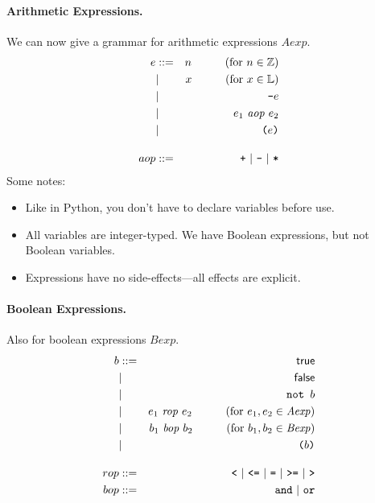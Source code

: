\documentclass[11pt]{article}
\begin{document}
\paragraph{Arithmetic Expressions.} We can now give a grammar for arithmetic expressions
$\mathit{Aexp}$.
\begin{eqnarray*}
e & ::= & n \hspace*{3em} (\mbox{for $n \in \mathbb{Z}$}) \\
  & | & x  \hspace*{3em} (\mbox{for $x \in \mathbb{L}$}) \\
  & | & \texttt{-}e \\
  & | & e_1 \mathit{~aop~} e_2 \\
  & | & \texttt{(}e\texttt{)}\\[1em]
aop & ::= & \texttt{+} \ |\ \texttt{-} \ |\  \texttt{*}
\end{eqnarray*}
Some notes:
\begin{itemize}[noitemsep]
\item Like in Python, you don't have to declare variables before use.
\item All variables are integer-typed. We have Boolean expressions, but not Boolean variables.
\item Expressions have no side-effects---all effects are explicit.
\end{itemize}

\paragraph{Boolean Expressions.} Also for boolean expressions $\mathit{Bexp}$.
\begin{eqnarray*}
b & ::= & \textsf{true} \\
  & | & \textsf{false} \\
  & | & \texttt{not~} b \\
  & | & e_1 \mathit{~rop~} e_2  \hspace*{3em} (\mbox{for $e_1, e_2 \in \mathit{Aexp}$}) \\
  & | & b_1 \mathit{~bop~} b_2  \hspace*{3em} (\mbox{for $b_1, b_2 \in \mathit{Bexp}$}) \\
  & | & \texttt{(}b\texttt{)}\\[1em]
rop & ::= & \verb+<+ \ |\ \verb+<=+  \ |\ \verb+=+ \ |\ \verb+>=+  \ |\ \verb+>+ \\
bop & ::= & \texttt{and} \ | \ \texttt{or}
\end{eqnarray*}
\end{document}
